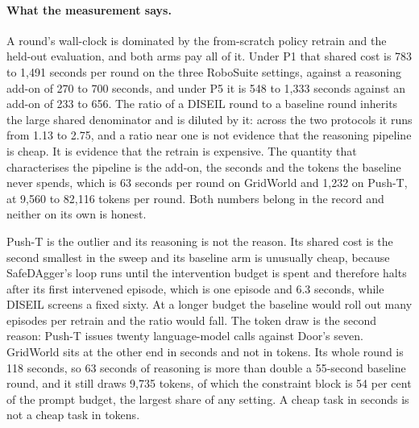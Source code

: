 \documentclass[letterpaper]{article}
\begin{document}
\paragraph{What the measurement says.} A round's wall-clock is dominated by the
from-scratch policy retrain and the held-out evaluation, and both arms pay all of it.
Under P1 that shared cost is 783 to 1,491 seconds per round on the three RoboSuite
settings, against a reasoning add-on of 270 to 700 seconds, and under P5 it is 548 to
1,333 seconds against an add-on of 233 to 656. The ratio of a DISEIL round to a baseline
round inherits the large shared denominator and is diluted by it: across the two
protocols it runs from 1.13 to 2.75, and a ratio near one is not evidence that the
reasoning pipeline is cheap. It is evidence that the retrain is expensive. The quantity
that characterises the pipeline is the add-on, the seconds and the tokens the baseline
never spends, which is 63 seconds per round on GridWorld and 1,232 on Push-T, at 9,560
to 82,116 tokens per round. Both numbers belong in the record and neither on its own is
honest.

Push-T is the outlier and its reasoning is not the reason. Its shared cost is the second
smallest in the sweep and its baseline arm is unusually cheap, because SafeDAgger's loop
runs until the intervention budget is spent and therefore halts after its first
intervened episode, which is one episode and 6.3 seconds, while DISEIL screens a fixed
sixty. At a longer budget the baseline would roll out many episodes per retrain and the
ratio would fall. The token draw is the second reason: Push-T issues twenty
language-model calls against Door's seven. GridWorld sits at the other end in seconds
and not in tokens. Its whole round is 118 seconds, so 63 seconds of reasoning is more
than double a 55-second baseline round, and it still draws 9,735 tokens, of which the
constraint block is 54 per cent of the prompt budget, the largest share of any setting.
A cheap task in seconds is not a cheap task in tokens.
\end{document}
